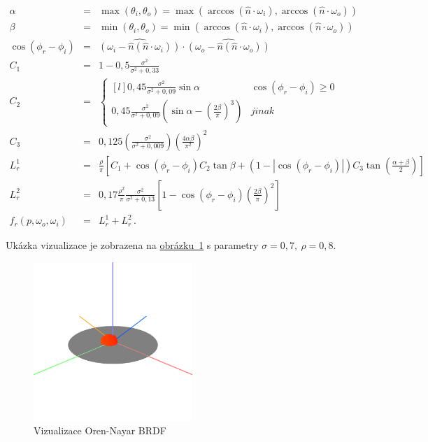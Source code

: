 \documentclass[czech,master]{diploma}
\newcommand{\uvec}[1]{\hat{#1}}
\newcommand{\point}{p}
\newcommand{\brdf}{f_r\left(\point,\omega_{o},\omega_{i}\right)}
\newcommand{\normVec}{\uvec{n}}
\newcommand{\inVec}{\omega_{i}}
\newcommand{\outVec}{\omega_{o}}
\newcommand{\alb}{\rho}
\newcommand{\rough}{\sigma}
\begin{document}
\newcommand{\cosphiri}{\cos\left(\phi_r-\phi_i\right)}

\begin{eqnarray}
  \alpha & = & \max(\theta_i , \theta_o) = \max(\arccos(\normVec\cdot\inVec), \arccos(\normVec\cdot\outVec)) \nonumber \\
  \beta & = & \min(\theta_i , \theta_o) = \min(\arccos(\normVec\cdot\inVec), \arccos(\normVec\cdot\outVec)) \nonumber \\
  \cosphiri & = & \widehat{\left( \inVec - \normVec(\normVec\cdot\inVec) \right)} \cdot \widehat{\left( \outVec - \normVec(\normVec\cdot\outVec)  \right)} \nonumber \\
  C_1 & = & 1-0{,}5\frac{\rough^{2}}{\rough^{2} + 0{,}33} \nonumber \\
  C_2 & = & \left\{\begin{matrix*}[l] 0{,}45\frac{\rough^{2}}{\rough^{2}+0{,}09}\sin\alpha & \cosphiri \geq 0\\ 0{,}45\frac{\rough^{2}}{\rough^2+0{,}09}\left(\sin\alpha-\left(\frac{2\beta}{\pi}\right)^{3}\right) & jinak \end{matrix*}\right. \nonumber \\
  C_3 & = & 0{,}125\left(\frac{\rough^2}{\rough^2 + 0{,}009}\right)\left(\frac{4\alpha\beta}{\pi^2}\right)^{2} \nonumber \\
  L^{1}_{r} & = & \frac{\alb}{\pi}\left[C_1 + \cosphiri C_2\tan\beta + \left( 1-\left | \cosphiri  \right | \right)C_3\tan \left(\frac{\alpha+\beta}{2}\right)\right] \nonumber \\
  L^{2}_{r} & = & 0{,}17\frac{\alb^{2}}{\pi}\frac{\rough^{2}}{\rough^2+0{,}13}\left[1 - \cosphiri  \left(\frac{2\beta}{\pi}\right)^{2} \right] \nonumber \\
  \brdf & = & L^{1}_{r} + L^{2}_{r}\,. \label{eq:OrenNayar}
\end{eqnarray}

Ukázka vizualizace je zobrazena na \hyperref[fig:orenNayarBRDFRender]{obrázku~\ref{fig:orenNayarBRDFRender}} s parametry \(\rough=0{,}7,~\alb = 0{,}8\).

\begin{figure}[ht]%
  \centering\includegraphics[width=6cm]{Figures/visualizations/brdfOrenNayar.png}%
  \caption{Vizualizace Oren-Nayar BRDF}%
  \label{fig:orenNayarBRDFRender}%
\end{figure}
\end{document}
